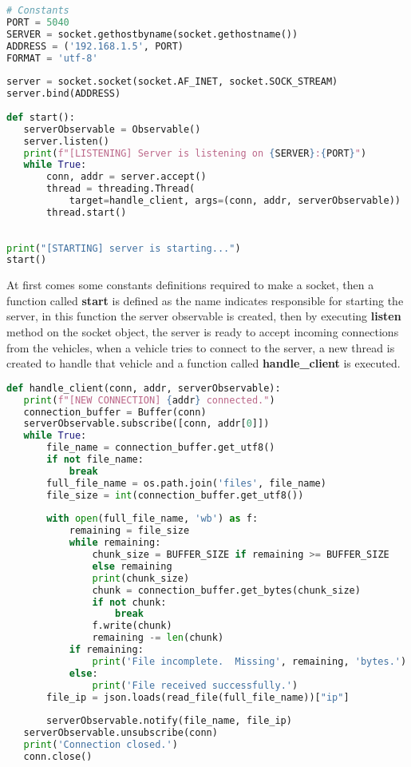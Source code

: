 \begin{lstlisting}[language=Python]
# Constants
PORT = 5040
SERVER = socket.gethostbyname(socket.gethostname())
ADDRESS = ('192.168.1.5', PORT)
FORMAT = 'utf-8'
 
server = socket.socket(socket.AF_INET, socket.SOCK_STREAM)
server.bind(ADDRESS)
 
def start():
   serverObservable = Observable()
   server.listen()
   print(f"[LISTENING] Server is listening on {SERVER}:{PORT}")
   while True:
       conn, addr = server.accept()
       thread = threading.Thread(
           target=handle_client, args=(conn, addr, serverObservable))
       thread.start()
 
 
print("[STARTING] server is starting...")
start()
\end{lstlisting}
At first comes some constants definitions required to make a socket, then a function called \textbf{start}  is defined as the name indicates responsible for starting the server, in this function the server observable is created, then by executing \textbf{listen} method on the socket object, the server is ready to accept incoming connections from the vehicles, when a vehicle tries to connect to the server, a new thread is created to handle that vehicle and a function called \textbf{handle\_client} is executed.

\clearpage
\begin{lstlisting}[language=Python]
def handle_client(conn, addr, serverObservable):
   print(f"[NEW CONNECTION] {addr} connected.")
   connection_buffer = Buffer(conn)
   serverObservable.subscribe([conn, addr[0]])
   while True:
       file_name = connection_buffer.get_utf8()
       if not file_name:
           break
       full_file_name = os.path.join('files', file_name)
       file_size = int(connection_buffer.get_utf8())
 
       with open(full_file_name, 'wb') as f:
           remaining = file_size
           while remaining:
               chunk_size = BUFFER_SIZE if remaining >= BUFFER_SIZE 
               else remaining
               print(chunk_size)
               chunk = connection_buffer.get_bytes(chunk_size)
               if not chunk:
                   break
               f.write(chunk)
               remaining -= len(chunk)
           if remaining:
               print('File incomplete.  Missing', remaining, 'bytes.')
           else:
               print('File received successfully.')
       file_ip = json.loads(read_file(full_file_name))["ip"]
 
       serverObservable.notify(file_name, file_ip)
   serverObservable.unsubscribe(conn)
   print('Connection closed.')
   conn.close()
\end{lstlisting}

